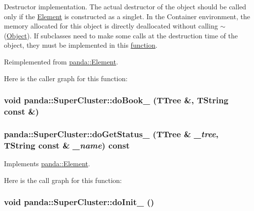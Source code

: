 Destructor implementation. The actual destructor of the object should be called only if the \hyperlink{classpanda_1_1Element}{Element} is constructed as a singlet. In the Container environment, the memory allocated for this object is directly deallocated without calling $\sim$(\hyperlink{classpanda_1_1Object}{Object}). If subclasses need to make some calls at the destruction time of the object, they must be implemented in this \hyperlink{namespacepanda_1_1function}{function}. 

Reimplemented from \hyperlink{classpanda_1_1Element_a7ce6bca6d7422aac78576742dc67f0b8}{panda::Element}.

Here is the caller graph for this function:\hypertarget{classpanda_1_1SuperCluster_a7d3d27e3fcc51d8c0fc8707515280bcd}{
\subsubsection[{doBook\_\-}]{\setlength{\rightskip}{0pt plus 5cm}void panda::SuperCluster::doBook\_\- (TTree \&, \/  TString const \&)}}
\label{classpanda_1_1SuperCluster_a7d3d27e3fcc51d8c0fc8707515280bcd}
\hypertarget{classpanda_1_1SuperCluster_a6b60a8ad8ccc886281aecdb05e1395fb}{
\subsubsection[{doGetStatus\_\-}]{ panda::SuperCluster::doGetStatus\_\- (TTree \& {\em \_\-tree}, \/  TString const \& {\em \_\-name}) const}}
\label{classpanda_1_1SuperCluster_a6b60a8ad8ccc886281aecdb05e1395fb}


Implements \hyperlink{classpanda_1_1Element_aeac30a79f7ce156033a2dd7538fc919d}{panda::Element}.

Here is the call graph for this function:\hypertarget{classpanda_1_1SuperCluster_aa8d0935f9067c9ea3abfa9e7cade89ea}{
\subsubsection[{doInit\_\-}]{\setlength{\rightskip}{0pt plus 5cm}void panda::SuperCluster::doInit\_\- ()}}
\label{classpanda_1_1SuperCluster_aa8d0935f9067c9ea3abfa9e7cade89ea}


